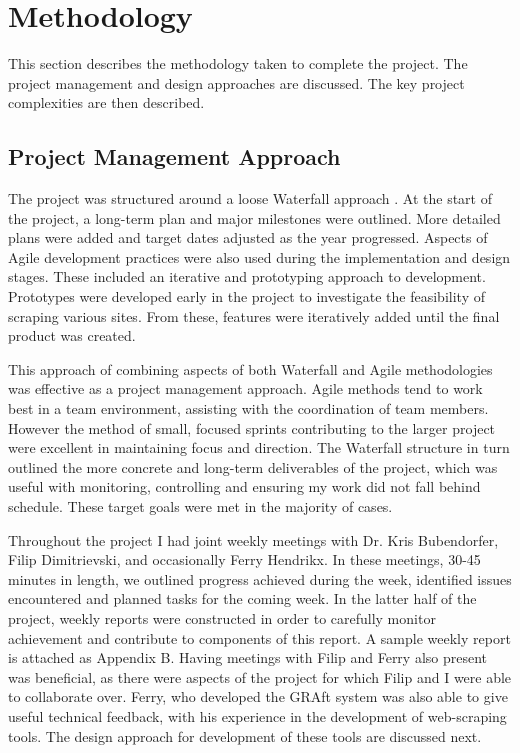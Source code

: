 \chapter{Methodology}\label{C:meth}

This section describes the methodology taken to complete the project. The project management and design approaches are discussed. The key project complexities are then described. 

\section{Project Management Approach}



The project was structured around a loose Waterfall approach \cite{waterfall}. At the start of the project, a long-term plan and major milestones were outlined. More detailed plans were added and target dates adjusted as the year progressed. Aspects of Agile development practices were also used during the implementation and design stages. These included an iterative and prototyping approach to development. Prototypes were developed early in the project to investigate the feasibility of scraping various sites. From these, features were iteratively added until the final product was created.

This approach of combining aspects of both Waterfall and Agile methodologies was effective as a project management approach. Agile methods tend to work best in a team environment, assisting with the coordination of team members. However the method of small, focused sprints contributing to the larger project were excellent in maintaining focus and direction. The Waterfall structure in turn outlined the more concrete and long-term deliverables of the project, which was useful with monitoring, controlling and ensuring my work did not fall behind schedule. These target goals were met in the majority of cases.

Throughout the project I had joint weekly meetings with Dr. Kris Bubendorfer, Filip Dimitrievski, and occasionally Ferry Hendrikx. In these meetings, 30-45 minutes in length, we outlined progress achieved during the week, identified issues encountered and planned tasks for the coming week. In the latter half of the project, weekly reports were constructed in order to carefully monitor achievement and contribute to components of this report. A sample weekly report is attached as Appendix B. Having meetings with Filip and Ferry also present was beneficial, as there were aspects of the project for which Filip and I were able to collaborate over. Ferry, who developed the GRAft system was also able to give useful technical feedback, with his experience in the development of web-scraping tools. The design approach for development of these tools are discussed next.

